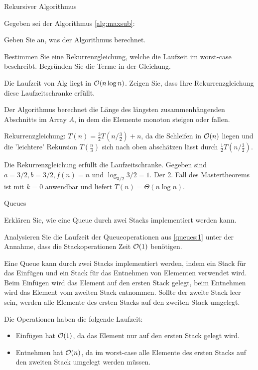 \documentclass{article}
\begin{document}
\begin{eexercises}{Rekursiver Algorithmus}{
    Gegeben sei der Algorithmus \ref{alg:maxsub}:
    
  }
  \item Geben Sie an, was der Algorithmus berechnet.
  \item Bestimmen Sie eine Rekurrenzgleichung, welche die Laufzeit im worst-case beschreibt. Begründen Sie die Terme in der Gleichung.
  \item Die Laufzeit von Alg liegt in $\mathcal{O}(n \log n)$. Zeigen Sie, dass Ihre Rekurrenzgleichung diese Laufzeitschranke erfüllt.
\end{eexercises}

\begin{solutions}
  \item Der Algorithmus berechnet die Länge des längsten zusammenhängenden Abschnitts im Array $A$, in dem die Elemente monoton steigen oder fallen.
  \item Rekurrenzgleichung: $T(n) = \frac{3}{2}T(n/\frac{3}{2}) + n$, da die Schleifen in $\mathcal{O}(n)$ liegen und die 'leichtere' Rekursion $T(\frac{n}{3})$ sich nach oben abschätzen lässt durch $\frac{1}{2}T(n/\frac{3}{2})$.
  \item Die Rekurrenzgleichung erfüllt die Laufzeitschranke. Gegeben sind $a=3/2, b=3/2, f(n)=n$ und $\log_{3/2}{3/2} = 1$. Der 2. Fall des Mastertheorems ist mit $k=0$ anwendbar und liefert $T(n) = \Theta(n \log n)$.
\end{solutions}

\begin{exercises}{Queues}
\item\label{queues:1} Erklären Sie, wie eine Queue durch zwei Stacks implementiert werden kann.
\item Analysieren Sie die Laufzeit der Queueoperationen aus \ref{queues:1} unter der Annahme, dass die Stackoperationen Zeit $\mathcal{O}(1)$ benötigen.
\end{exercises}

\begin{solutions}
  \item Eine Queue kann durch zwei Stacks implementiert werden, indem ein Stack für das Einfügen und ein Stack für das Entnehmen von Elementen verwendet wird. Beim Einfügen wird das Element auf den ersten Stack gelegt, beim Entnehmen wird das Element vom zweiten Stack entnommen. Sollte der zweite Stack leer sein, werden alle Elemente des ersten Stacks auf den zweiten Stack umgelegt.
  \item Die Operationen haben die folgende Laufzeit:
  \begin{itemize}
    \item Einfügen hat $\mathcal{O}(1)$, da das Element nur auf den ersten Stack gelegt wird.
    \item Entnehmen hat $\mathcal{O}(n)$, da im worst-case alle Elemente des ersten Stacks auf den zweiten Stack umgelegt werden müssen.
  \end{itemize}
\end{solutions}
\end{document}
